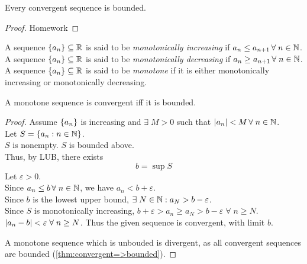 \documentclass[12pt]{article}
\begin{document}
\begin{thm} \label{thm:convergent=>bounded}
    Every convergent sequence is bounded.
\end{thm}
\begin{proof}
    Homework
\end{proof}

\begin{defn} \label{defn:monotone seq}
    A sequence $\set{a_{n}} \subseteq \R$ is said to be \emph{monotonically increasing} if $a_{n} \leq a_{n+1} \,\forall\; n \in \mathbb{N}$. \\
    A sequence $\set{a_{n}} \subseteq \R$ is said to be \emph{monotonically decreasing} if $a_{n} \geq a_{n+1} \,\forall\; n \in \mathbb{N}$. \\
    A sequence $\set{a_{n}} \subseteq \R$ is said to be \emph{monotone} if it is either monotonically increasing or monotonically decreasing.
\end{defn}

\begin{thm} \label{thm:MCT}
    A monotone sequence is convergent iff it is bounded.
\end{thm}
\begin{proof}
    Assume $\set{a_{n}}$ is increasing and $\exists\; M > 0$ such that $\abs{ a_{n} } < M \,\forall\; n \in \N$. \\
    Let $S = \set{ a_{n} : n \in \N }$. \\
    $S$ is nonempty. $S$ is bounded above. \\
    Thus, by LUB, there exists \[
        b = \sup S
    \] Let $\varepsilon > 0$. \\
    Since $a_{n} \leq b \,\forall\; n \in \mathbb{N}$, we have $a_{n} < b + \varepsilon$. \\
    Since $b$ is the lowest upper bound, $\exists\; N \in \mathbb{N} : a_{N} > b - \varepsilon$. \\
    Since $S$ is monotonically increasing, $b + \varepsilon > a_{n} \geq a_{N} > b - \varepsilon \;\forall\; n \geq N$. \\
    $\abs{ a_{n} - b } < \varepsilon \;\forall\; n \geq N$. Thus the given sequence is convergent, with limit $b$.

    A monotone sequence which is unbouded is divergent, as all convergent sequences are bounded (\cref{thm:convergent=>bounded}).
\end{proof}
\end{document}
